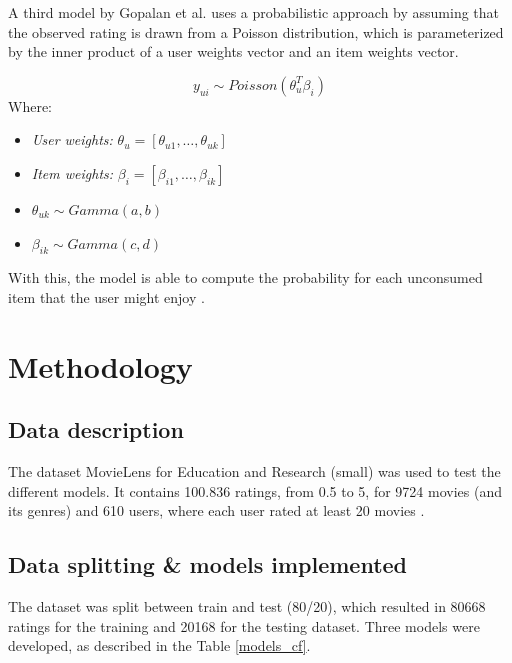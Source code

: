 \documentclass[conference]{IEEEtran}
\begin{document}
A third model by Gopalan et al. uses a probabilistic approach by assuming that the observed rating is drawn from a Poisson distribution, which is parameterized by the inner product of a user weights vector and an item weights vector.

\begin{equation}
y_{ui} \sim Poisson(\theta_u^T \beta_i)
\end{equation}
\noindent
Where:
\begin{itemize}
    \renewcommand{\labelitemi}{~}
    \item \textit{User weights:} $\theta_u = [\theta_{u1}, \dots, \theta_{uk}]$
    \item \textit{Item weights:} $\beta_i = [\beta_{i1}, \dots, \beta_{ik}]$
    \item $\theta_{uk} \sim Gamma(a, b)$
    \item $\beta_{ik} \sim Gamma(c, d)$
\end{itemize}

With this, the model is able to compute the probability for each unconsumed item that the user might enjoy \cite{gopalan2014scalablerecommendationpoissonfactorization}.

\section{Methodology}

\subsection{Data description}

The dataset MovieLens for Education and Research (small) was used to test the different models. It contains 100.836 ratings, from 0.5 to 5, for 9724 movies (and its genres) and 610 users, where each user rated at least 20 movies \cite{MovieLens}.

\subsection{Data splitting \& models implemented}

The dataset was split between train and test (80/20), which resulted in 80668 ratings for the training and 20168 for the testing dataset. Three models were developed, as described in the Table \ref{models_cf}.

\begin{table}[H]
\centering
\caption{Implemented models description.}
\label{models_cf}
\end{table}
\end{document}
